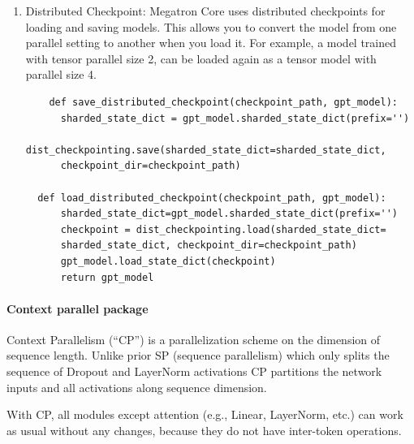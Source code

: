 \documentclass[11pt]{article}  %
\begin{document}
\begin{enumerate}
  \item Distributed Checkpoint: Megatron Core uses distributed checkpoints for loading and saving models.
  This allows you to convert the model from one parallel setting to another when you load it. For example, a model trained with tensor parallel size 2, can be loaded again as a tensor model with parallel size 4.
  \begin{lstlisting}
    def save_distributed_checkpoint(checkpoint_path, gpt_model):
      sharded_state_dict = gpt_model.sharded_state_dict(prefix='')
      dist_checkpointing.save(sharded_state_dict=sharded_state_dict, 
      checkpoint_dir=checkpoint_path)

  def load_distributed_checkpoint(checkpoint_path, gpt_model):
      sharded_state_dict=gpt_model.sharded_state_dict(prefix='')
      checkpoint = dist_checkpointing.load(sharded_state_dict=
      sharded_state_dict, checkpoint_dir=checkpoint_path)
      gpt_model.load_state_dict(checkpoint)
      return gpt_model
  \end{lstlisting}
\end{enumerate}


\paragraph{Context parallel package}
Context Parallelism (``CP'') is a parallelization scheme on the dimension of sequence length. Unlike prior SP (sequence parallelism) which only splits the sequence of Dropout and LayerNorm activations CP partitions the network inputs and all activations along sequence dimension.

With CP, all modules except attention (e.g., Linear, LayerNorm, etc.) can work as usual without any changes, because they do not have inter-token operations.
\end{document}
